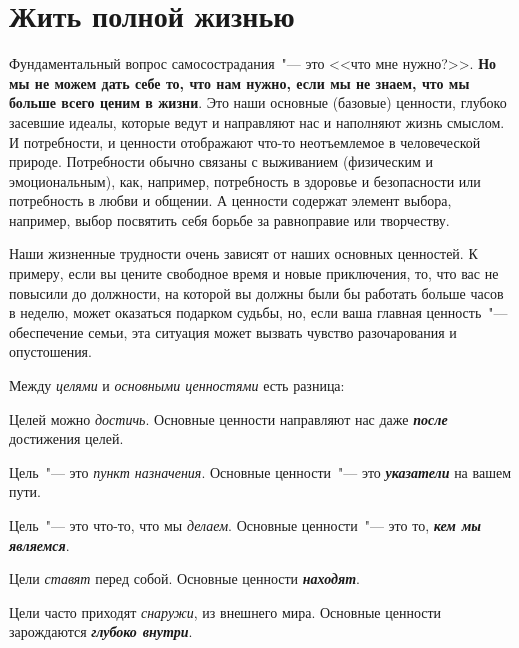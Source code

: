 
\chapter{Жить полной жизнью} \label{Living_Deeply}

Фундаментальный вопрос самосострадания~"--- это <<что мне нужно?>>. \textbf{Но мы не можем дать себе то, что нам нужно, если мы не знаем, что мы больше всего ценим в жизни}\cite{82}. Это наши основные (базовые) ценности, глубоко засевшие идеалы, которые ведут и направляют нас и наполняют жизнь смыслом. И потребности, и ценности отображают что-то неотъемлемое в человеческой природе. Потребности обычно связаны с выживанием (физическим и эмоциональным), как, например, потребность в здоровье и безопасности или потребность в любви и общении. А ценности содержат элемент выбора, например, выбор посвятить себя борьбе за равноправие или творчеству. 

Наши жизненные трудности очень зависят от наших основных ценностей. К примеру, если вы цените свободное время и новые приключения, то, что вас не повысили до должности, на которой вы должны были бы работать больше часов в неделю, может оказаться подарком судьбы, но, если ваша главная ценность~"--- обеспечение семьи, эта ситуация может вызвать чувство разочарования и опустошения.

\vspace{2ex}

Между \emph{целями} и \emph{основными ценностями} есть разница:

\begin{itemize}
	\itemdiamondsuit Целей можно \emph{достичь}. Основные ценности направляют нас даже \emph{\textbf{после}} достижения целей.

	\itemdiamondsuit Цель~"--- это \emph{пункт назначения}. Основные ценности~"--- это \emph{\textbf{указатели}} на вашем пути.

	\itemdiamondsuit Цель~"--- это что-то, что мы \emph{делаем}. Основные ценности~"--- это то, \emph{\textbf{кем мы являемся}}.

	\itemdiamondsuit Цели \emph{ставят} перед собой. Основные ценности \emph{\textbf{находят}}.

	\itemdiamondsuit Цели часто приходят \emph{снаружи}, из внешнего мира. Основные ценности зарождаются \emph{\textbf{глубоко внутри}}. 
\end{itemize}

\vspace{2ex}

